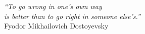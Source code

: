 \cleardoublepage
\thispagestyle{plain}

\vspace*{8cm}

\begin{flushright}
   \textsl{``To go wrong in one's own way\\
   is better than to go right in someone else’s.''} \\
\vspace*{1cm}
           Fyodor Mikhailovich Dostoyevsky
\end{flushright}
